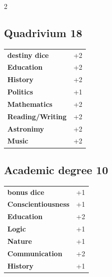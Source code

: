 \begin{multicols}{2}
\begin{tcolorbox}

\end{tcolorbox}

\begin{tcolorbox}
    \subsection*{Quadrivium \hfill \small{18 }}
    \tcblower




\begin{tabular}{@{}ll@{}}
    \textbf{destiny dice} & +2\\
    \textbf{Education} & +2\\
    \textbf{History} & +2\\
    \textbf{Politics} & +1\\
    \textbf{Mathematics} & +2\\
    \textbf{Reading/Writing} & +2\\
    \textbf{Astronimy} & +2\\
    \textbf{Music} & +2\\
\end{tabular}


\end{tcolorbox}

\begin{tcolorbox}
    \subsection*{Academic degree \hfill \small{10 }}
    \tcblower




\begin{tabular}{@{}ll@{}}
    \textbf{bonus dice} & +1\\
    \textbf{Conscientiousness} & +1\\
    \textbf{Education} & +2\\
    \textbf{Logic} & +1\\
    \textbf{Nature} & +1\\
    \textbf{Communication} & +2\\
    \textbf{History} & +1\\
\end{tabular}


\end{tcolorbox}
\end{multicols}
